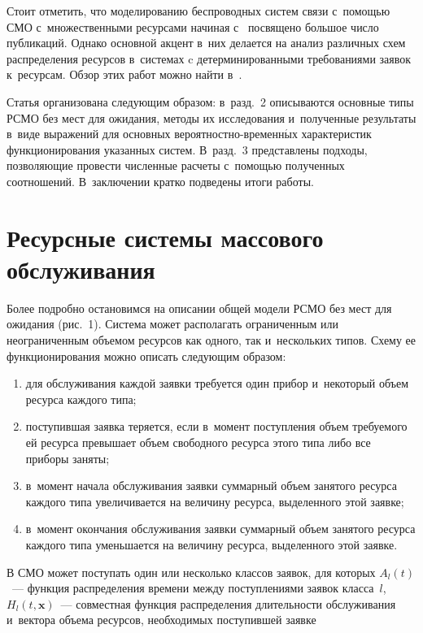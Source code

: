 \begin{multicols}{2}
Стоит отметить, что моделированию беспроводных систем связи с~по\-мощью СМО 
с~множественными ресурсами начиная с~\cite{Gimpelson} посвящено большое чис\-ло 
публикаций. Однако основной акцент в~них делается на анализ различных схем 
распределения ресурсов в~системах c детерминированными требованиями заявок 
к~ресурсам. Обзор этих работ можно найти в~\cite{Kelly,Ross,Basharin}.

Статья организована следующим образом: в~разд.~2 описываются основные типы 
РСМО без мест для ожидания, методы их исследования и~полученные результаты 
в~виде выражений для основных ве\-ро\-ят\-но\-ст\-но-вре\-мен\-н$\acute{\mbox{ы}}$х характеристик 
функционирования указанных сис\-тем. В~разд.~3 представлены подходы, позволяющие 
провести численные расчеты с~по\-мощью полученных соотношений. В~заключении кратко 
подведены итоги работы.

\section{Ресурсные системы массового обслуживания}

Более подробно остановимся на описании общей модели РСМО без мест для ожидания 
(рис.~1).
Система может располагать ограниченным или неограниченным объемом ресурсов как 
одного, так и~нескольких типов. Схему ее функционирования можно описать 
следующим образом:
\begin{enumerate}[(1)]
\item для обслуживания каждой заявки требуется один прибор и~некоторый объем 
ресурса каж\-до\-го типа;
\item поступившая заявка теряется, если в~момент поступления объем 
требуемого ей ресурса превышает объем свободного ресурса этого типа либо все 
приборы заняты;
\item в~момент начала обслуживания заявки суммарный объем занятого ресурса 
каждого типа увеличивается на величину ресурса, выделенного этой заявке;
\item в~момент окончания обслуживания заявки суммарный объем занятого 
ресурса каждого типа уменьшается на величину ресурса, выделенного этой заявке.
\end{enumerate}



В СМО может поступать один или несколько классов заявок, для которых
$A_l(t)$~--- функция распределения времени между поступлениями заявок класса~$l$,
$H_l(t,\mathbf{x})$~--- совместная функция распределения длительности 
обслуживания и~вектора объема ресурсов, необходимых поступившей заявке\linebreak\vspace*{-12pt}


\end{multicols}
